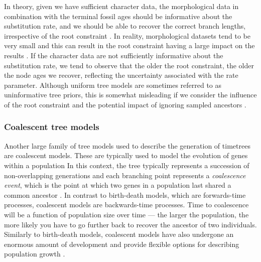 In theory, given we have sufficient character data, the morphological data in combination with the terminal fossil ages should be informative about the substitution rate, and we should be able to recover the correct branch lengths, irrespective of the root constraint \citep{Ronquist2012a,Klopfstein2019}.
In reality, morphological datasets tend to be very small and this can result in the root constraint having a large impact on the results \citep{matzke2016}.
If the character data are not sufficiently informative about the substitution rate, we tend to observe that the older the root constraint, the older the node ages we recover, reflecting the uncertainty associated with the rate parameter.
Although uniform tree models are sometimes referred to as uninformative tree priors, this is somewhat misleading if we consider the influence of the root constraint and the potential impact of ignoring sampled ancestors \citep{Gavryushkina2014}.

\subsubsection{Coalescent tree models}
Another large family of tree models used to describe the generation of timetrees are coalescent models.
These are typically used to model the evolution of genes within a population
In this context, the tree typically represents a succession of non-overlapping generations and each branching point represents a \textit{coalescence event}, which is the point at which two genes in a population last shared a common ancestor \citep{Kingman1982}.
In contrast to birth-death models, which are forwards-time processes, coalescent models are backwards-time processes.
Time to coalescence will be a function of population size over time --- the larger the population, the more likely you have to go further back to recover the ancestor of two individuals. %
Similarly to birth-death models, coalescent models have also undergone an enormous amount of development and provide flexible options for describing population growth \citep{Beerli2001, Drummond2005, Mashayekhi2019}. %

